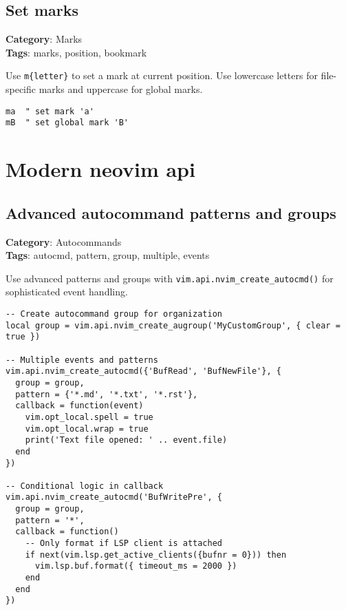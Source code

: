 {{{{{{{\section{Set marks}

\textbf{Category}: Marks\\ \textbf{Tags}: marks, position, bookmark
\vspace{0.5cm}

Use {\footnotesize \Verb§m{letter}§} to set a mark at current position. Use lowercase letters for file-specific marks and uppercase for global marks.

\begin{Exa*}{}
\begin{Verbatim}[fontsize=\footnotesize, breaklines, breakanywhere]
ma  " set mark 'a'
mB  " set global mark 'B'
\end{Verbatim}
\end{Exa*}

\chapter{Modern neovim api}
\section{Advanced autocommand patterns and groups}

\textbf{Category}: Autocommands\\ \textbf{Tags}: autocmd, pattern, group, multiple, events
\vspace{0.5cm}

Use advanced patterns and groups with {\footnotesize \Verb§vim.api.nvim_create_autocmd()§} for sophisticated event handling.

\begin{Exa*}{}
\begin{Verbatim}[fontsize=\footnotesize, breaklines, breakanywhere]
-- Create autocommand group for organization
local group = vim.api.nvim_create_augroup('MyCustomGroup', { clear = true })

-- Multiple events and patterns
vim.api.nvim_create_autocmd({'BufRead', 'BufNewFile'}, {
  group = group,
  pattern = {'*.md', '*.txt', '*.rst'},
  callback = function(event)
    vim.opt_local.spell = true
    vim.opt_local.wrap = true
    print('Text file opened: ' .. event.file)
  end
})

-- Conditional logic in callback
vim.api.nvim_create_autocmd('BufWritePre', {
  group = group,
  pattern = '*',
  callback = function()
    -- Only format if LSP client is attached
    if next(vim.lsp.get_active_clients({bufnr = 0})) then
      vim.lsp.buf.format({ timeout_ms = 2000 })
    end
  end
})
\end{Verbatim}
\end{Exa*}

}}}}}}}
